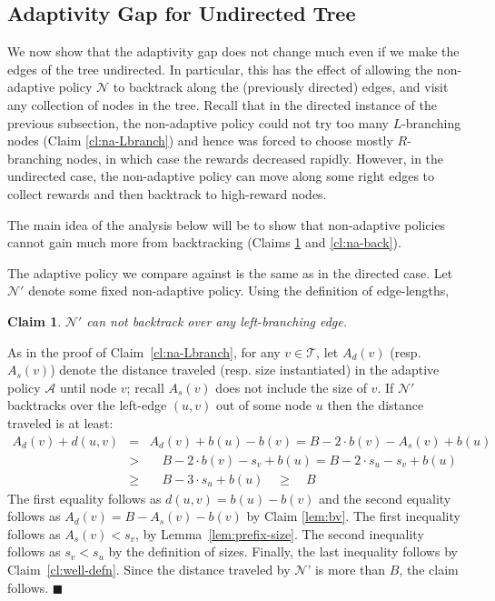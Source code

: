 \documentclass[11pt,letterpaper]{article}
\newtheorem{claim}[theorem]{Claim}
\numberwithin{algorithm}{section}
\newenvironment{proof}{

\noindent{\bf Proof:}}
{\hfill$\blacksquare$


}
\newcommand{\A}[0]{{\ensuremath{\mathcal{A}}}\xspace}
\newcommand{\N}[0]{{\ensuremath{\mathcal{N}}}\xspace}
\newcommand{\T}{\ensuremath{\mathcal{T}}\xspace}
\begin{document}
\subsection{Adaptivity Gap for Undirected Tree}

We now show that the adaptivity gap does not change much even if we make the edges of the tree undirected.
In particular, this has the effect of allowing the non-adaptive policy \N to backtrack along the (previously directed) edges, and visit any collection of nodes in the tree.
Recall that in the directed instance of the previous subsection, the non-adaptive policy could not try too many $L$-branching nodes (Claim \ref{cl:na-Lbranch}) and hence was forced to choose mostly $R$-branching nodes, in which case the rewards decreased rapidly.
However, in the undirected case, the non-adaptive policy can move along some right edges to collect rewards and then backtrack to high-reward nodes.

The main idea of the analysis below will be to show that  non-adaptive policies cannot gain much more from backtracking (Claims \ref{cl:na-noLback} and \ref{cl:na-back}).

The adaptive policy we compare against is the same as in the directed case. Let $\N'$ denote some fixed non-adaptive policy.
Using the definition of edge-lengths,
\begin{claim} \label{cl:na-noLback}
$\N'$ can not backtrack over any left-branching edge.
\end{claim}
\begin{proof}
As in the proof of Claim~\ref{cl:na-Lbranch}, for any $v\in\T$, let $A_d(v)$ (resp. $A_s(v)$) denote the distance traveled (resp. size instantiated) in the adaptive policy \A until node $v$; recall $A_s(v)$ does not include the size of $v$. If $\N'$ backtracks over the left-edge $(u,v)$ out of some node $u$ then the distance traveled is at least:
\begin{eqnarray*}
A_d(v) + d(u,v) & = &  A_d(v)+b(u)-b(v) =  B-2\cdot b(v)-A_s(v)+b(u)  \\ & > & \quad B-2\cdot b(v)-s_{v}+b(u)
=  B-2\cdot s_u-s_{v}+b(u) \\
&  \ge &  \quad  B-3\cdot s_u +b(u) \quad\ge \quad B
\end{eqnarray*}
The first equality follows as $d(u,v)=b(u)-b(v)$ and the second equality follows as $A_d(v)=B- A_s(v) - b(v)$ by Claim 
\ref{lem:bv}.
The first inequality follows as $A_s(v)<s_v$,  by Lemma~\ref{lem:prefix-size}. The second inequality follows as $s_v < s_u$ by the definition of sizes. Finally, the last inequality follows by Claim~\ref{cl:well-defn}.
Since the distance traveled by \N' is more than $B$, the claim follows.
\end{proof}
\end{document}
